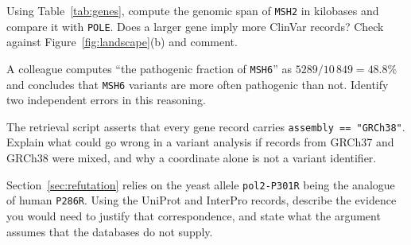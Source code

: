 \begin{exercise}
Using Table~\ref{tab:genes}, compute the genomic span of \texttt{MSH2} in
kilobases and compare it with \texttt{POLE}. Does a larger gene imply more
ClinVar records? Check against Figure~\ref{fig:landscape}(b) and comment.
\end{exercise}

\begin{exercise}
A colleague computes ``the pathogenic fraction of \texttt{MSH6}'' as
$5289/10\,849 = 48.8\%$ and concludes that \texttt{MSH6} variants are more often
pathogenic than not. Identify two independent errors in this reasoning.
\end{exercise}

\begin{exercise}
The retrieval script asserts that every gene record carries
\texttt{assembly == "GRCh38"}. Explain what could go wrong in a variant analysis
if records from GRCh37 and GRCh38 were mixed, and why a coordinate alone is not
a variant identifier.
\end{exercise}

\begin{exercise}[(harder)]
Section~\ref{sec:refutation} relies on the yeast allele \texttt{pol2-P301R} being
the analogue of human \texttt{P286R}. Using the UniProt and InterPro records,
describe the evidence you would need to justify that correspondence, and state
what the argument assumes that the databases do not supply.
\end{exercise}


